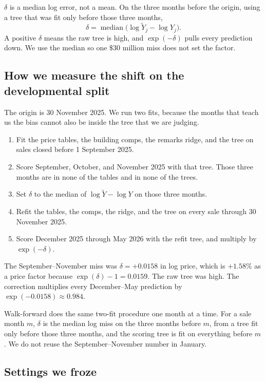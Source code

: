 \documentclass[11pt]{article}
\begin{document}
\(\delta\) is a median log error, not a mean. On the three months before the origin, using a tree that was fit only before those three months,
\[
\delta = \operatorname{median}\bigl(\log \tilde Y_j - \log Y_j\bigr).
\]
A positive \(\delta\) means the raw tree is high, and \(\exp(-\delta)\) pulls every prediction down. We use the median so one \(\$30\) million miss does not set the factor.

\subsection{How we measure the shift on the developmental split}

The origin is 30 November 2025. We run two fits, because the months that teach us the bias cannot also be inside the tree that we are judging.

\begin{enumerate}
\item Fit the price tables, the building comps, the remarks ridge, and the tree on sales closed before 1 September 2025.
\item Score September, October, and November 2025 with that tree. Those three months are in none of the tables and in none of the trees.
\item Set \(\delta\) to the median of \(\log\tilde Y - \log Y\) on those three months.
\item Refit the tables, the comps, the ridge, and the tree on every sale through 30 November 2025.
\item Score December 2025 through May 2026 with the refit tree, and multiply by \(\exp(-\delta)\).
\end{enumerate}

The September--November miss was \(\delta = +0.0158\) in log price, which is \(+1.58\%\) as a price factor because \(\exp(\delta) - 1 = 0.0159\). The raw tree was high. The correction multiplies every December--May prediction by \(\exp(-0.0158) \approx 0.984\).

Walk-forward does the same two-fit procedure one month at a time. For a sale month \(m\), \(\delta\) is the median log miss on the three months before \(m\), from a tree fit only before those three months, and the scoring tree is fit on everything before \(m\). We do not reuse the September--November number in January.

\subsection{Settings we froze}
\end{document}
